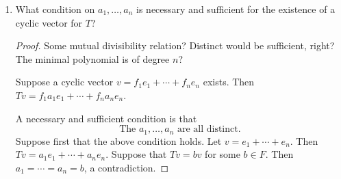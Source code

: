 \documentclass[../psets.tex]{subfiles}
\begin{document}
\begin{enumerate}
\begin{enumerate}
\begin{proof}



            $\ker(\rho)$ is the set of all polynomials in $F[X]$, the corresponding linear transformations of which annihilate $V$. Consider the $F[X]$-module $(V,T)$. We know that $V=\bigoplus_{i=1}^nF[X]/(X-a_i)$. Thus, a basis of the $F[X]$-module $V$ is the $e_i$'s. We want to construct a linear transformation that is a polynomial in $T$ of minimal degree such that $p(T)v=0$ for an arbitrary $v\in V$. Let $f_1e_1+\cdots+f_ne_n$ be arbitrary. The smallest polynomial that sends $e_i$ to 0 is $(X-e_i)$. The smallest polynomial that sends $e_i$ and $e_j$ to zero is $(X-e_i)(X-e_j)$. Suppose one of smaller degree did. Then it's a monomial $X-a$ that's monic up to units. But unless $X-a\in(X-a_i),(X-a_j)$, we have no bueno. Thus, $(X-a_i)\mid X-a$ and $(X-a_j)\mid X-a$, so we have a contradiction. Inducting, we get that the minimal polynomial is $\prod_{i=1}^n(X-a_i)$.
        \end{proof}
        \item What condition on $a_1,\dots,a_n$ is necessary and sufficient for the existence of a cyclic vector for $T$?
        \begin{proof}
            Some mutual divisibility relation? Distinct would be sufficient, right? The minimal polynomial is of degree $n$?

            Suppose a cyclic vector $v=f_1e_1+\cdots+f_ne_n$ exists. Then $Tv=f_1a_1e_1+\cdots+f_na_ne_n$.
            

            A necessary and sufficient condition is that
            \begin{equation*}
                \boxed{\text{The }a_1,\dots,a_n\text{ are all distinct.}}
            \end{equation*}
            Suppose first that the above condition holds. Let $v=e_1+\cdots+e_n$. Then $Tv=a_1e_1+\cdots+a_ne_n$. Suppose that $Tv=bv$ for some $b\in F$. Then $a_1=\cdots=a_n=b$, a contradiction.


\end{proof}
\end{enumerate}
\end{enumerate}
\end{document}
